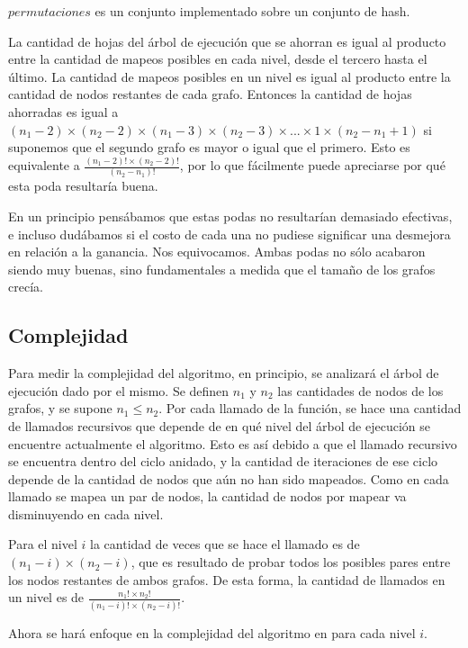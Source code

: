 $permutaciones$ es un conjunto implementado sobre un conjunto de hash.

La cantidad de hojas del árbol de ejecución que se ahorran es igual al
producto entre la cantidad de mapeos posibles en cada nivel, desde el tercero
hasta el último. La cantidad de mapeos posibles en un nivel es igual al
producto entre la cantidad de nodos restantes de cada grafo. Entonces la
cantidad de hojas ahorradas es igual a $(n_1 - 2) \times (n_2 - 2) \times
(n_1 - 3) \times (n_2 - 3) \times ... \times 1 \times (n_2 - n_1 + 1)$ si
suponemos que el segundo grafo es mayor o igual que el primero. Esto es
equivalente a $\frac{(n_1 - 2)! \times (n_2 - 2)!}{(n_2 - n_1)!}$, por lo que
fácilmente puede apreciarse por qué esta poda resultaría buena.

En un principio pensábamos que estas podas no resultarían demasiado efectivas,
e incluso dudábamos si el costo de cada una no pudiese significar una
desmejora en relación a la ganancia. Nos equivocamos. Ambas podas no sólo
acabaron siendo muy buenas, sino fundamentales a medida que el tamaño de los
grafos crecía.

\subsection{Complejidad}

Para medir la complejidad del algoritmo, en principio, se analizará el
árbol de ejecución dado por el mismo. Se definen $n_1$ y $n_2$ las cantidades
de nodos de los grafos, y se supone $n_1 \leq n_2$. Por cada llamado de
la función, se hace una cantidad de llamados recursivos que depende de en qué
nivel del árbol de ejecución se encuentre actualmente el algoritmo. Esto es
así debido a que el llamado recursivo se encuentra dentro del ciclo anidado,
y la cantidad de iteraciones de ese ciclo depende de la cantidad de nodos que
aún no han sido mapeados. Como en cada llamado se mapea un par de nodos, la
cantidad de nodos por mapear va disminuyendo en cada nivel.

Para el nivel $i$ la cantidad de veces que se hace el llamado es de
$(n_1 - i) \times (n_2 - i)$, que es resultado de probar todos los posibles
pares entre los nodos restantes de ambos grafos. De esta forma, la cantidad de
llamados en un nivel es de
$\frac{n_1! \times n_2!}{(n_1 - i)! \times (n_2 - i)!}$.

Ahora se hará enfoque en la complejidad del algoritmo en para cada nivel $i$.

